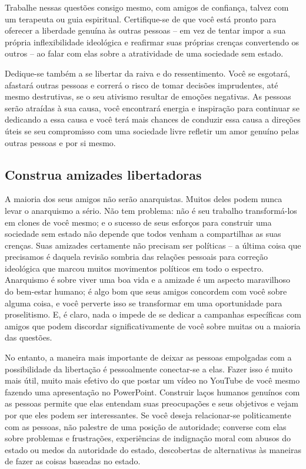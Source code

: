 Trabalhe nessas questões consigo mesmo, com amigos de confiança, talvez com um terapeuta ou guia espiritual. Certifique-se de que você está pronto para oferecer a liberdade genuína às outras pessoas -- em vez de tentar impor a sua própria inflexibilidade ideológica e reafirmar suas próprias crenças convertendo os outros -- ao falar com elas sobre a atratividade de uma sociedade sem estado.

Dedique-se também a se libertar da raiva e do ressentimento. Você se esgotará, afastará outras pessoas e correrá o risco de tomar decisões imprudentes, até mesmo destrutivas, se o seu ativismo resultar de emoções negativas. As pessoas serão atraídas à sua causa, você encontrará energia e inspiração para continuar se dedicando a essa causa e você terá mais chances de conduzir essa causa a direções úteis se seu compromisso com uma sociedade livre refletir um amor genuíno pelas outras pessoas e por si mesmo.

\subsection*{Construa amizades libertadoras}

A maioria dos seus amigos não serão anarquistas. Muitos deles podem nunca levar o anarquismo a sério. Não tem problema: não é seu trabalho transformá-los em clones de você mesmo; e o sucesso de seus esforços para construir uma sociedade sem estado não depende que todos venham a compartilhas as suas crenças. Suas amizades certamente não precisam ser políticas -- a última coisa que precisamos é daquela revisão sombria das relações pessoais para correção ideológica que marcou muitos movimentos políticos em todo o espectro. Anarquismo é sobre viver uma boa vida e a amizade é um aspecto maravilhoso do bem-estar humano; é algo bom que seus amigos concordem com você sobre alguma coisa, e você perverte isso se transformar em uma oportunidade para proselitismo. E, é claro, nada o impede de se dedicar a campanhas específicas com amigos que podem discordar significativamente de você sobre muitas ou a maioria das questões.

No entanto, a maneira mais importante de deixar as pessoas empolgadas com a possibilidade da libertação é pessoalmente conectar-se a elas. Fazer isso é muito mais útil, muito mais efetivo do que postar um vídeo no YouTube de você mesmo fazendo uma apresentação no PowerPoint. Construir laços humanos genuínos com as pessoas permite que elas entendam suas preocupações e seus objetivos e vejam por que eles podem ser interessantes. Se você deseja relacionar-se politicamente com as pessoas, não palestre de uma posição de autoridade; converse com elas sobre problemas e frustrações, experiências de indignação moral com abusos do estado ou medos da autoridade do estado, descobertas de alternativas às maneiras de fazer as coisas baseadas no estado.

